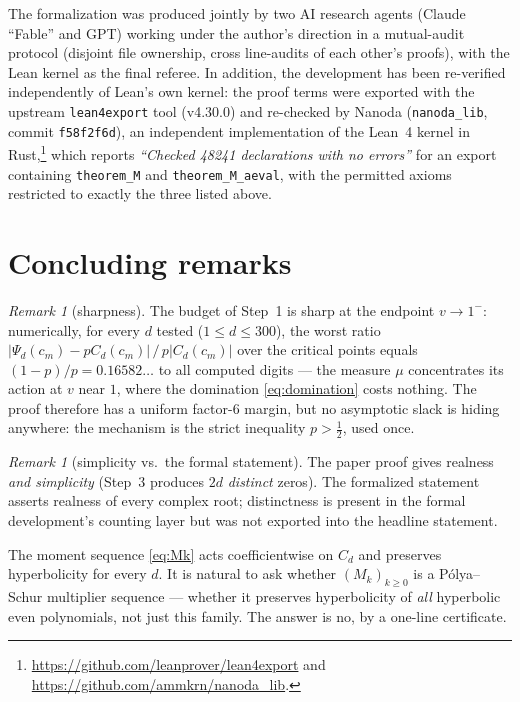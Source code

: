 \documentclass[11pt]{amsart}
\theoremstyle{definition}
\theoremstyle{remark}
\newtheorem{remark}[theorem]{Remark}
\begin{document}
The formalization was produced jointly by two AI research agents
(Claude ``Fable'' and GPT) working under the author's direction in a
mutual-audit protocol (disjoint file ownership, cross line-audits of
each other's proofs), with the Lean kernel as the final referee. In
addition, the development has been re-verified independently of
Lean's own kernel: the proof terms were exported with the upstream
\texttt{lean4export} tool (v4.30.0) and re-checked by Nanoda
(\texttt{nanoda\_lib}, commit \texttt{f58f2f6d}), an independent
implementation of the Lean~4 kernel in
Rust,\footnote{\url{https://github.com/leanprover/lean4export} and
\url{https://github.com/ammkrn/nanoda_lib}.} which reports
\emph{``Checked 48241 declarations with no errors''} for an export
containing \texttt{theorem\_M} and \texttt{theorem\_M\_aeval}, with
the permitted axioms restricted to exactly the three listed above.

\section{Concluding remarks}\label{sec:remarks}

\begin{remark}[sharpness]\label{rem:sharp}
The budget of Step~1 is sharp at the endpoint $v\to1^-$: numerically,
for every $d$ tested ($1\le d\le 300$), the worst ratio
$|\Psi_d(c_m)-pC_d(c_m)|\,/\,p|C_d(c_m)|$ over the critical points
equals $(1-p)/p=0.16582\ldots$ to all computed digits --- the measure
$\mu$ concentrates its action at $v$ near $1$, where the domination
\eqref{eq:domination} costs nothing. The proof therefore has a uniform
factor-$6$ margin, but no asymptotic slack is hiding anywhere: the
mechanism is the strict inequality $p>\tfrac12$, used once.
\end{remark}

\begin{remark}[simplicity vs.\ the formal statement]
The paper proof gives realness \emph{and simplicity} (Step~3 produces
$2d$ \emph{distinct} zeros). The formalized statement asserts realness
of every complex root; distinctness is present in the formal
development's counting layer but was not exported into the headline
statement.
\end{remark}

The moment sequence \eqref{eq:Mk} acts coefficientwise on $C_d$ and
preserves hyperbolicity for every $d$. It is natural to ask whether
$(M_k)_{k\ge0}$ is a P\'olya--Schur multiplier sequence --- whether it
preserves hyperbolicity of \emph{all} hyperbolic even polynomials,
not just this family. The answer is no, by a one-line certificate.
\end{document}
